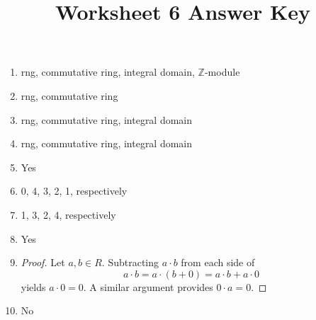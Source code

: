 \documentclass{article}
\title{Worksheet 6 Answer Key}
\author{}\date{}
\newcommand{\Z}{\mathbb{Z}}
\begin{document}
\maketitle

\begin{enumerate}
	\item rng, commutative ring, integral domain, $\Z$-module
	\item rng, commutative ring
	\item rng, commutative ring, integral domain
	\item rng, commutative ring, integral domain
	\item Yes
	\item 0, 4, 3, 2, 1, respectively
	\item 1, 3, 2, 4, respectively
	\item Yes
	\item 
		\begin{proof}
			Let $a,b\in R$. Subtracting $a\cdot b$ from each side of
			\[
				a\cdot b = a\cdot (b+0) = a\cdot b + a\cdot 0
			\]
			yields $a\cdot 0 = 0$. A similar argument provides $0\cdot a=0$.
		\end{proof}
	\item No
\end{enumerate}
\end{document}
